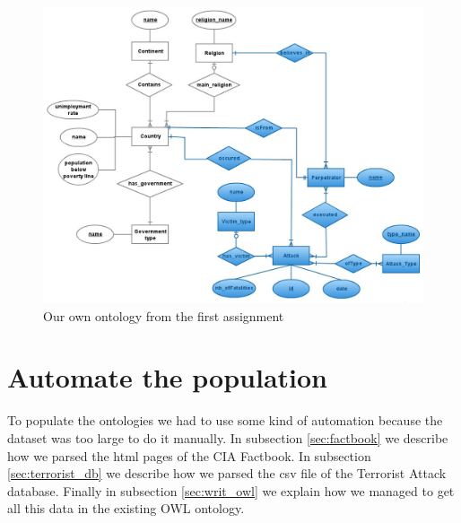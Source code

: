\documentclass{article}
\begin{document}
\begin{figure}
\includegraphics[width=1\textwidth]{TerroristAttacks.jpg}
\caption{Our own ontology from the first assignment}
\label{fig:ontology}
\end{figure}
\section{Automate the population}
To populate the ontologies we had to use some kind of automation because the dataset was too large to do it manually. In subsection \ref{sec:factbook} we describe how we parsed the html pages of the CIA Factbook. In subsection \ref{sec:terrorist_db} we describe how we parsed the csv file of the Terrorist Attack database. Finally in subsection \ref{sec:writ_owl} we explain how we managed to get all this data in the existing OWL ontology.
\end{document}
